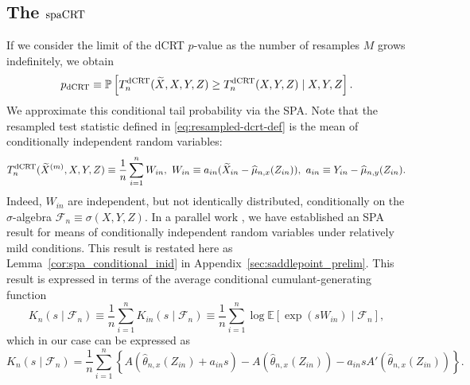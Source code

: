 \documentclass[12pt]{article}
\theoremstyle{definition}
\def\P{\mathbb{P}}
\def\P{\mathbb{P}}
\newcommand{\E}{\mathbb E}								%
\renewcommand{\P}{\mathbb{P}}							%
\newcommand{\srx}{X}									%
\newcommand{\srz}{Z}									%
\newcommand{\srxk}{\widetilde X}						%
\newcommand{\sry}{Y}									%
\newcommand{\dCRT}{\textnormal{dCRT}} 					%
\newcommand{\spacrt}{\textnormal{spaCRT}}               %
\begin{document}
\subsection{The $\spacrt$}

If we consider the limit of the dCRT $p$-value as the number of resamples $M$ grows indefinitely, we obtain
\begin{align*}
p_{\dCRT} \equiv \P\left[T_n^{\dCRT}(\widetilde{X},X,Y,Z)\geq T_n^{\dCRT}(X,Y,Z) \mid X,Y,Z\right].
\end{align*}
We approximate this conditional tail probability via the SPA. Note that the resampled test statistic defined in \eqref{eq:resampled-dcrt-def} is the mean of  conditionally independent random variables:
\begin{align*}
  T_n^{\dCRT}(\srxk^{(m)}, \srx, \sry, \srz) \equiv \frac{1}{n}\sum_{i=1}^n W_{in},\ W_{in}\equiv a_{in}(\widetilde X_{in}-\widehat{\mu}_{n,x}(Z_{in})),\ a_{in}\equiv Y_{in}-\widehat\mu_{n,y}(Z_{in}).
\end{align*}
Indeed, $W_{in}$ are independent, but not identically distributed, conditionally on the $\sigma$-algebra $\mathcal{F}_n \equiv \sigma(\srx,\sry,\srz)$. In a parallel work \citep{Niu2024}, we have established an SPA result for means of conditionally independent random variables under relatively mild conditions. This result is restated here as Lemma~\ref{cor:spa_conditional_inid} in Appendix~\ref{sec:saddlepoint_prelim}. This result is expressed in terms of the average conditional cumulant-generating function
\begin{equation} \label{eq:accgf}
K_n(s \mid \mathcal F_n) \equiv \frac{1}{n} \sum_{i = 1}^n K_{in}(s \mid \mathcal F_n) \equiv \frac{1}{n}\sum_{i = 1}^n \log \E[\exp(s W_{in}) \mid \mathcal F_n],
\end{equation}
which in our case can be expressed as
\begin{equation}
K_n(s \mid \mathcal F_n) = \frac{1}{n}\sum_{i = 1}^n \left\{A(\widehat \theta_{n,x}(\srz_{in})+a_{in}s)-A(\widehat \theta_{n,x}(\srz_{in}))-a_{in}sA'(\widehat \theta_{n,x}(\srz_{in}))\right\}.
\end{equation}
\end{document}
